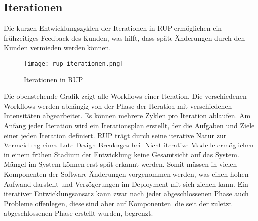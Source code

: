\subsection{Iterationen}
Die kurzen Entwicklungszyklen der Iterationen in RUP ermöglichen ein frühzeitiges Feedback des Kunden, was hilft, dass späte Änderungen durch den Kunden vermieden werden können. 
\begin{center}
\begin{figure}[h]
	\centering
	\texttt{[image: rup\_iterationen.png]}
	\caption{Iterationen in RUP}
\end{figure}
\end{center}
Die obenstehende Grafik zeigt alle Workflows einer Iteration. Die verschiedenen Workflows werden abhängig von der Phase der Iteration mit verschiedenen Intensitäten abgearbeitet. 
Es können mehrere Zyklen pro Iteration ablaufen.
Am Anfang jeder Iteration wird ein Iterationsplan erstellt, der die Aufgaben und Ziele einer jeden Iteration definiert. 
RUP trägt durch seine iterative Natur zur Vermeidung eines Late Design Breakages bei. Nicht iterative Modelle ermöglichen in einem frühen Stadium der Entwicklung keine Gesamtsicht auf das System. Mängel im System können erst spät erkannt werden. Somit müssen in vielen Komponenten der Software Änderungen vorgenommen werden, was einen hohen Aufwand darstellt und Verzögerungen im Deployment mit sich ziehen kann. 
Ein iterativer Entwicklungsansatz kann zwar nach jeder abgeschlossenen Phase auch Probleme offenlegen, diese sind aber auf Komponenten, die seit der zuletzt abgeschlossenen Phase erstellt wurden, begrenzt.
